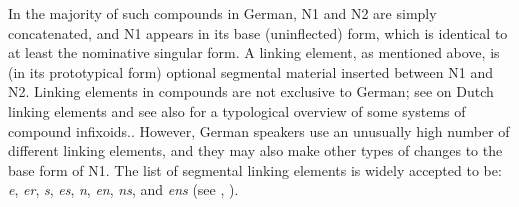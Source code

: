 In the majority of such compounds in German, N1 and N2 are simply concatenated, and N1 appears in its base (uninflected) form, which is identical to at least the nominative singular form.
A linking element, as mentioned above, is (in its prototypical form) optional segmental material inserted between N1 and N2.
Linking elements in compounds are not exclusive to German; see \textcite{SchreuderEa1998,BangaEa2013a,BangaEa2013b} on Dutch linking elements and see also \textcite[27]{KrottEa2007} for a typological overview of some systems of compound infixoids..%
However, German speakers use an unusually high number of different linking elements, and they may also make other types of changes to the base form of N1.%
The list of segmental linking elements is widely accepted to be: \textit{e}, \textit{er}, \textit{s}, \textit{es}, \textit{n}, \textit{en}, \textit{ns}, and \textit{ens} (see \citealt[31]{Neef2015}, \citealt{KrottEa2007}).

